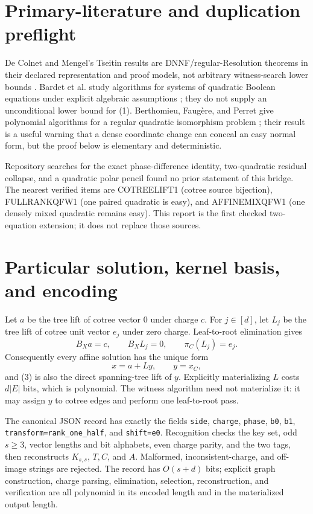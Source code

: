 \documentclass[11pt]{article}
\begin{document}
\section{Primary-literature and duplication preflight}
De Colnet and Mengel's Tseitin results are DNNF/regular-Resolution theorems in
their declared representation and proof models, not arbitrary witness-search
lower bounds \cite{dcm}.  Bardet et al. study algorithms for systems of
quadratic Boolean equations under explicit algebraic assumptions \cite{bardet};
they do not supply an unconditional lower bound for (1).  Berthomieu,
Faug\`ere, and Perret give polynomial algorithms for a regular quadratic
isomorphism problem \cite{bfp}; their result is a useful warning that a dense
coordinate change can conceal an easy normal form, but the proof below is
elementary and deterministic.

Repository searches for the exact phase-difference identity, two-quadratic
residual collapse, and a quadratic polar pencil found no prior statement of
this bridge.  The nearest verified items are COTREELIFT1 (cotree source
bijection), FULLRANKQFW1 (one paired quadratic is easy), and AFFINEMIXQFW1
(one densely mixed quadratic remains easy).  This report is the first checked
two-equation extension; it does not replace those sources.

\section{Particular solution, kernel basis, and encoding}
Let $a$ be the tree lift of cotree vector $0$ under charge $c$.  For
$j\in[d]$, let $L_j$ be the tree lift of cotree unit vector $e_j$ under zero
charge.  Leaf-to-root elimination gives
\[
 B_Xa=c,\qquad B_XL_j=0,\qquad \pi_C(L_j)=e_j.           \tag{2}
\]
Consequently every affine solution has the unique form
\[
 x=a+Ly,\qquad y=x_C,                                   \tag{3}
\]
and (3) is also the direct spanning-tree lift of $y$.  Explicitly
materializing $L$ costs $d|E|$ bits, which is polynomial.  The witness
algorithm need not materialize it: it may assign $y$ to cotree edges and
perform one leaf-to-root pass.

The canonical JSON record has exactly the fields
\texttt{side}, \texttt{charge}, \texttt{phase}, \texttt{b0}, \texttt{b1},
\texttt{transform=rank\_one\_half}, and \texttt{shift=e0}.  Recognition
checks the key set, odd $s\ge3$, vector lengths and bit alphabets, even charge
parity, and the two tags, then reconstructs $K_{s,s}$, $T,C$, and $A$.
Malformed, inconsistent-charge, and off-image strings are rejected.  The
record has $O(s+d)$ bits; explicit graph construction, charge parsing,
elimination, selection, reconstruction, and verification are all polynomial
in its encoded length and in the materialized output length.
\end{document}
